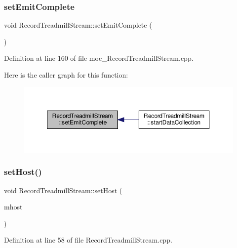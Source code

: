 \subsubsection{\texorpdfstring{set\+Emit\+Complete}{setEmitComplete}}
{\footnotesize\ttfamily void Record\+Treadmill\+Stream\+::set\+Emit\+Complete (\begin{DoxyParamCaption}{ }\end{DoxyParamCaption})\hspace{0.3cm}{\ttfamily [signal]}}



Definition at line 160 of file moc\+\_\+\+Record\+Treadmill\+Stream.\+cpp.

Here is the caller graph for this function\+:
\nopagebreak
\begin{figure}[H]
\begin{center}
\leavevmode
\includegraphics[width=350pt]{class_record_treadmill_stream_a5eb6b44556167062b6679e4f5f265a99_icgraph}
\end{center}
\end{figure}
\mbox{\label{class_record_treadmill_stream_a730f24f651775d7499b43dd58cf72379}} 
\subsubsection{\texorpdfstring{set\+Host()}{setHost()}}
{\footnotesize\ttfamily void Record\+Treadmill\+Stream\+::set\+Host (\begin{DoxyParamCaption}\item[{Q\+String}]{mhost }\end{DoxyParamCaption})}



Definition at line 58 of file Record\+Treadmill\+Stream.\+cpp.

\mbox{\label{class_record_treadmill_stream_ae16198d0acd13cb4fa401ae1d00e2282}} 
